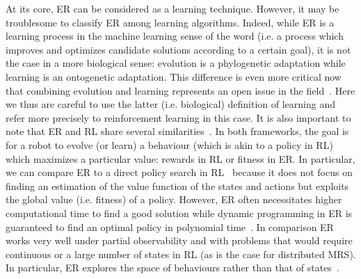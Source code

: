     At its core, ER can be considered as a learning technique. However, it may be troublesome to classify ER among learning algorithms. Indeed, while ER is a learning process in the machine learning sense of the word (i.e. a process which improves and optimizes candidate solutions according to a certain goal), it is not the case in a more biological sense: evolution is a phylogenetic adaptation while learning is an ontogenetic adaptation. This difference is even more critical now that combining evolution and learning represents an open issue in the field~\parencite{Urzelai2001, Mouret2014, Doncieux2015a}. Here we thus are careful to use the latter (i.e. biological) definition of learning and refer more precisely to reinforcement learning in this case. It is also important to note that ER and RL share several similarities~\parencite{Whiteson2012, Stulp2013, Doncieux2015a}. In both frameworks, the goal is for a robot to evolve (or learn) a behaviour (which is akin to a policy in RL) which maximizes a particular value: rewards in RL or fitness in ER. In particular, we can compare ER to a direct policy search in RL~\parencite{Kober2013} because it does not focus on finding an estimation of the value function of the states and actions but exploits the global value (i.e. fitness) of a policy. However, ER often necessitates higher computational time to find a good solution while dynamic programming in ER is guaranteed to find an optimal policy in polynomial time~\parencite{Littman1994, Whiteson2012}. In comparison ER works very well under partial observability and with problems that would require continuous or a large number of states in RL (as is the case for distributed MRS). In particular, ER explores the space of behaviours rather than that of states~\parencite{Panait2005}.


